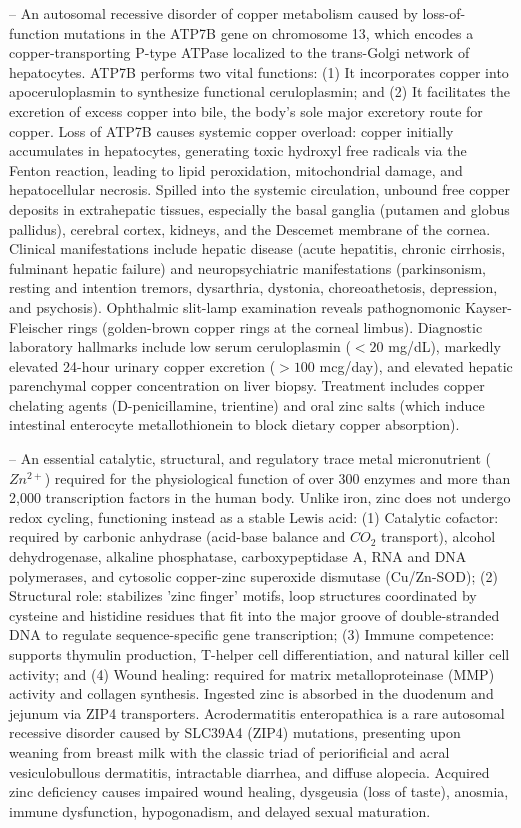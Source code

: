 -- An autosomal recessive disorder of copper metabolism caused by loss-of-function mutations in the ATP7B gene on chromosome 13, which encodes a copper-transporting P-type ATPase localized to the trans-Golgi network of hepatocytes. ATP7B performs two vital functions: (1) It incorporates copper into apoceruloplasmin to synthesize functional ceruloplasmin; and (2) It facilitates the excretion of excess copper into bile, the body's sole major excretory route for copper. Loss of ATP7B causes systemic copper overload: copper initially accumulates in hepatocytes, generating toxic hydroxyl free radicals via the Fenton reaction, leading to lipid peroxidation, mitochondrial damage, and hepatocellular necrosis. Spilled into the systemic circulation, unbound free copper deposits in extrahepatic tissues, especially the basal ganglia (putamen and globus pallidus), cerebral cortex, kidneys, and the Descemet membrane of the cornea. Clinical manifestations include hepatic disease (acute hepatitis, chronic cirrhosis, fulminant hepatic failure) and neuropsychiatric manifestations (parkinsonism, resting and intention tremors, dysarthria, dystonia, choreoathetosis, depression, and psychosis). Ophthalmic slit-lamp examination reveals pathognomonic Kayser-Fleischer rings (golden-brown copper rings at the corneal limbus). Diagnostic laboratory hallmarks include low serum ceruloplasmin ($<20$ mg/dL), markedly elevated 24-hour urinary copper excretion ($>100$ mcg/day), and elevated hepatic parenchymal copper concentration on liver biopsy. Treatment includes copper chelating agents (D-penicillamine, trientine) and oral zinc salts (which induce intestinal enterocyte metallothionein to block dietary copper absorption).

-- An essential catalytic, structural, and regulatory trace metal micronutrient ($Zn^{2+}$) required for the physiological function of over 300 enzymes and more than 2,000 transcription factors in the human body. Unlike iron, zinc does not undergo redox cycling, functioning instead as a stable Lewis acid: (1) Catalytic cofactor: required by carbonic anhydrase (acid-base balance and $CO_2$ transport), alcohol dehydrogenase, alkaline phosphatase, carboxypeptidase A, RNA and DNA polymerases, and cytosolic copper-zinc superoxide dismutase (Cu/Zn-SOD); (2) Structural role: stabilizes 'zinc finger' motifs, loop structures coordinated by cysteine and histidine residues that fit into the major groove of double-stranded DNA to regulate sequence-specific gene transcription; (3) Immune competence: supports thymulin production, T-helper cell differentiation, and natural killer cell activity; and (4) Wound healing: required for matrix metalloproteinase (MMP) activity and collagen synthesis. Ingested zinc is absorbed in the duodenum and jejunum via ZIP4 transporters. Acrodermatitis enteropathica is a rare autosomal recessive disorder caused by SLC39A4 (ZIP4) mutations, presenting upon weaning from breast milk with the classic triad of periorificial and acral vesiculobullous dermatitis, intractable diarrhea, and diffuse alopecia. Acquired zinc deficiency causes impaired wound healing, dysgeusia (loss of taste), anosmia, immune dysfunction, hypogonadism, and delayed sexual maturation.

